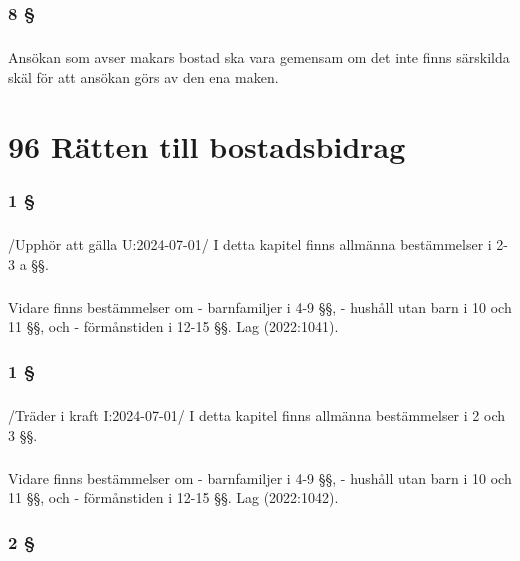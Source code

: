 \documentclass[a4paper,notitlepage,openany,10pt]{book}
\begin{document}
\subsection*{8 §}
\paragraph*{}
Ansökan som avser makars bostad ska vara gemensam om det inte finns särskilda skäl för att ansökan görs av den ena maken.
\chapter*{96 Rätten till bostadsbidrag}
\subsection*{1 §}
\paragraph*{}
/Upphör att gälla U:2024-07-01/
I detta kapitel finns allmänna bestämmelser i 2-3 a §§.
\paragraph*{}
Vidare finns bestämmelser om
\newline - barnfamiljer i 4-9 §§,
\newline - hushåll utan barn i 10 och 11 §§, och
\newline - förmånstiden i 12-15 §§.
Lag (2022:1041).
\subsection*{1 §}
\paragraph*{}
/Träder i kraft I:2024-07-01/
I detta kapitel finns allmänna bestämmelser i 2 och 3 §§.
\paragraph*{}
Vidare finns bestämmelser om
\newline - barnfamiljer i 4-9 §§,
\newline - hushåll utan barn i 10 och 11 §§, och
\newline - förmånstiden i 12-15 §§.
Lag (2022:1042).
\subsection*{2 §}
\end{document}
